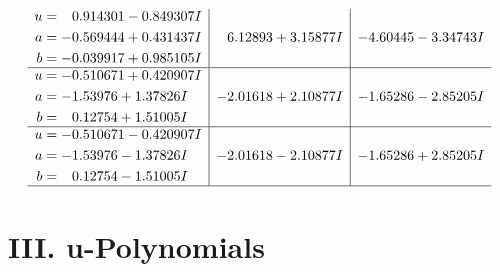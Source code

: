 \documentclass[1p]{elsarticle_modified}
\theoremstyle{definition}
\begin{document}
$$\begin{array}{c|c|c}
\begin{aligned}
u &= \phantom{-}0.914301 - 0.849307 I \\
a &= -0.569444 + 0.431437 I \\
b &= -0.039917 + 0.985105 I\end{aligned}
 & \phantom{-}6.12893 + 3.15877 I & -4.60445 - 3.34743 I \\ \hline\begin{aligned}
u &= -0.510671 + 0.420907 I \\
a &= -1.53976 + 1.37826 I \\
b &= \phantom{-}0.12754 + 1.51005 I\end{aligned}
 & -2.01618 + 2.10877 I & -1.65286 - 2.85205 I \\ \hline\begin{aligned}
u &= -0.510671 - 0.420907 I \\
a &= -1.53976 - 1.37826 I \\
b &= \phantom{-}0.12754 - 1.51005 I\end{aligned}
 & -2.01618 - 2.10877 I & -1.65286 + 2.85205 I\\
 \hline 
 \end{array}$$\newpage
\newpage\renewcommand{\arraystretch}{1}
\centering \section*{ III. u-Polynomials}
\end{document}
